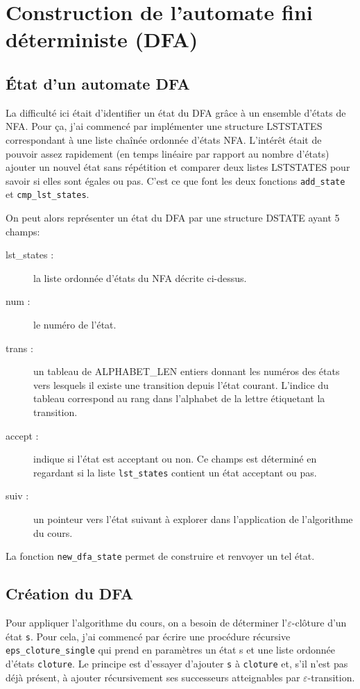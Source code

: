 \documentclass[12pt, a4paper]{article}
\begin{document}
\section{Construction de l'automate fini déterministe (DFA)}

\subsection{État d'un automate DFA}

La difficulté ici était d'identifier un état du DFA grâce à un ensemble d'états de NFA. Pour ça, j'ai commencé par implémenter une structure LSTSTATES correspondant à une liste chaînée ordonnée d'états NFA. L'intérêt était de pouvoir assez rapidement (en temps linéaire par rapport au nombre d'états) ajouter un nouvel état sans répétition et comparer deux listes LSTSTATES pour savoir si elles sont égales ou pas. C'est ce que font les deux fonctions \texttt{add\_state} et \texttt{cmp\_lst\_states}.

On peut alors représenter un état du DFA par une structure DSTATE ayant 5 champs:

\begin{description}
\item[lst\_states :] la liste ordonnée d'états du NFA décrite ci-dessus.
\item[num :] le numéro de l'état.
\item[trans :] un tableau de ALPHABET\_LEN entiers donnant les numéros des états vers lesquels il existe une transition depuis l'état courant. L'indice du tableau correspond au rang dans l'alphabet de la lettre étiquetant la transition.
\item[accept :] indique si l'état est acceptant ou non. Ce champs est déterminé en regardant si la liste \texttt{lst\_states} contient un état acceptant ou pas.
\item[suiv :] un pointeur vers l'état suivant à explorer dans l'application de l'algorithme du cours.
\end{description}

La fonction \texttt{new\_dfa\_state} permet de construire et renvoyer un tel état.


\subsection{Création du DFA}

Pour appliquer l'algorithme du cours, on a besoin de déterminer l'$\varepsilon$-clôture d'un état \texttt{s}. Pour cela, j'ai commencé par écrire une procédure récursive \texttt{eps\_cloture\_single} qui prend en paramètres un état s et une liste ordonnée d'états \texttt{cloture}. Le principe est d'essayer d'ajouter \texttt{s} à \texttt{cloture} et, s'il n'est pas déjà présent, à ajouter récursivement ses successeurs atteignables par $\varepsilon$-transition.
\end{document}
